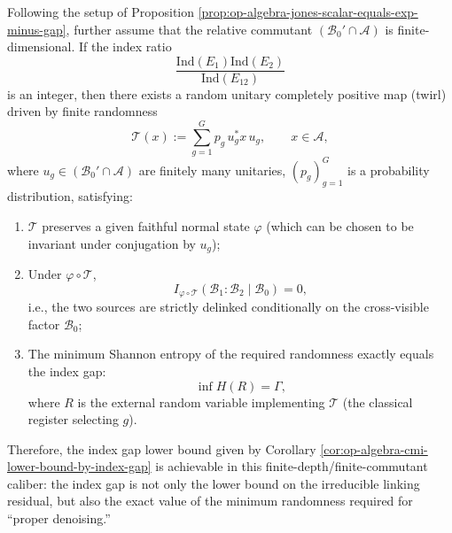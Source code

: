 \begin{proposition}\label{prop:op-algebra-twirl-achieves-index-gap}
Following the setup of Proposition \ref{prop:op-algebra-jones-scalar-equals-exp-minus-gap}, further assume that the relative commutant \((\mathcal{B}_0'\cap\mathcal{A})\) is finite-dimensional.
If the index ratio
\[
\frac{\mathrm{Ind}(E_1)\mathrm{Ind}(E_2)}{\mathrm{Ind}(E_{12})}
\]
is an integer, then there exists a random unitary completely positive map (twirl) driven by finite randomness
\[
\mathcal{T}(x):=\sum_{g=1}^{G}p_g\,u_g^\ast x\,u_g,\qquad x\in\mathcal{A},
\]
where \(u_g\in(\mathcal{B}_0'\cap\mathcal{A})\) are finitely many unitaries, \((p_g)_{g=1}^{G}\) is a probability distribution, satisfying:
\begin{enumerate}
  \item \(\mathcal{T}\) preserves a given faithful normal state \(\varphi\) (which can be chosen to be invariant under conjugation by \(u_g\));
  \item Under \(\varphi\circ\mathcal{T}\),
  \[
  \boxed{\;
  I_{\varphi\circ\mathcal{T}}(\mathcal{B}_1:\mathcal{B}_2\mid\mathcal{B}_0)=0, \;}
  \]
  i.e., the two sources are strictly delinked conditionally on the cross-visible factor \(\mathcal{B}_0\);
  \item The minimum Shannon entropy of the required randomness exactly equals the index gap:
  \[
  \boxed{\;
  \inf H(R)=\Gamma, \;}
  \]
  where \(R\) is the external random variable implementing \(\mathcal{T}\) (the classical register selecting \(g\)).
\end{enumerate}
Therefore, the index gap lower bound given by Corollary \ref{cor:op-algebra-cmi-lower-bound-by-index-gap} is achievable in this finite-depth/finite-commutant caliber: the index gap is not only the lower bound on the irreducible linking residual, but also the exact value of the minimum randomness required for ``proper denoising.''
\end{proposition}
